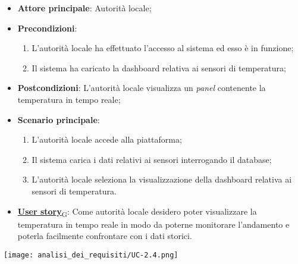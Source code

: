 \begin{itemize}
	\item \textbf{Attore principale}: Autorità locale;
	\item \textbf{Precondizioni}:
	      \begin{enumerate}
		      \item L'autorità locale ha effettuato l'accesso al sistema ed esso è in funzione;
		      \item Il sistema ha caricato la dashboard relativa ai sensori di temperatura;
	      \end{enumerate}
	\item \textbf{Postcondizioni}: L'autorità locale visualizza un \textit{panel} contenente la temperatura in tempo reale;
	\item \textbf{Scenario principale}:
	      \begin{enumerate}
		      \item L'autorità locale accede alla piattaforma;
		      \item Il sistema carica i dati relativi ai sensori interrogando il database;
		      \item L'autorità locale seleziona la visualizzazione della dashboard relativa ai sensori di temperatura.
	      \end{enumerate}
	\item \href{https://7last.github.io/docs/rtb/documentazione-interna/glossario\#user-story}{\textbf{User story}\textsubscript{G}}:
	      Come autorità locale desidero poter visualizzare la temperatura in tempo reale in modo da poterne monitorare l'andamento
	      e poterla facilmente confrontare con i dati storici.
\end{itemize}
\begin{center}
	\texttt{[image: analisi\_dei\_requisiti/UC-2.4.png]}
\end{center}

